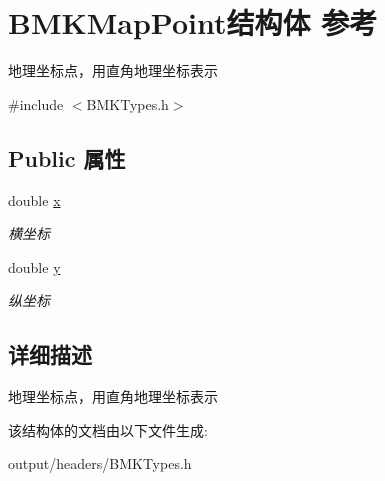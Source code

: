 \hypertarget{struct_b_m_k_map_point}{}\section{B\+M\+K\+Map\+Point结构体 参考}
\label{struct_b_m_k_map_point}


地理坐标点，用直角地理坐标表示  




{\ttfamily \#include $<$B\+M\+K\+Types.\+h$>$}

\subsection*{Public 属性}
\begin{DoxyCompactItemize}
\item 
\hypertarget{struct_b_m_k_map_point_a8c0ca1c3f0cbb5fe183ae7745781d8fb}{}double \hyperlink{struct_b_m_k_map_point_a8c0ca1c3f0cbb5fe183ae7745781d8fb}{x}\label{struct_b_m_k_map_point_a8c0ca1c3f0cbb5fe183ae7745781d8fb}

\begin{DoxyCompactList}\small\item\em 横坐标 \end{DoxyCompactList}\item 
\hypertarget{struct_b_m_k_map_point_a9d0aff0bad009459af85d1e51a194341}{}double \hyperlink{struct_b_m_k_map_point_a9d0aff0bad009459af85d1e51a194341}{y}\label{struct_b_m_k_map_point_a9d0aff0bad009459af85d1e51a194341}

\begin{DoxyCompactList}\small\item\em 纵坐标 \end{DoxyCompactList}\end{DoxyCompactItemize}


\subsection{详细描述}
地理坐标点，用直角地理坐标表示 

该结构体的文档由以下文件生成\+:\begin{DoxyCompactItemize}
\item 
output/headers/B\+M\+K\+Types.\+h\end{DoxyCompactItemize}
